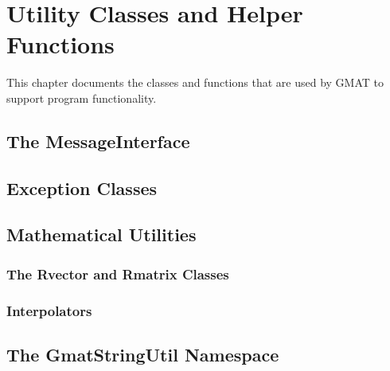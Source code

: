 \chapter{\label{chapter:Utilities}Utility Classes and Helper Functions}

This chapter documents the classes and functions that are used by GMAT to support program functionality.

\section{The MessageInterface}

\section{Exception Classes}

\section{Mathematical Utilities}

\subsection{The Rvector and Rmatrix Classes}

\subsection{Interpolators}

\section{\label{section:StringUtil}The GmatStringUtil Namespace}
